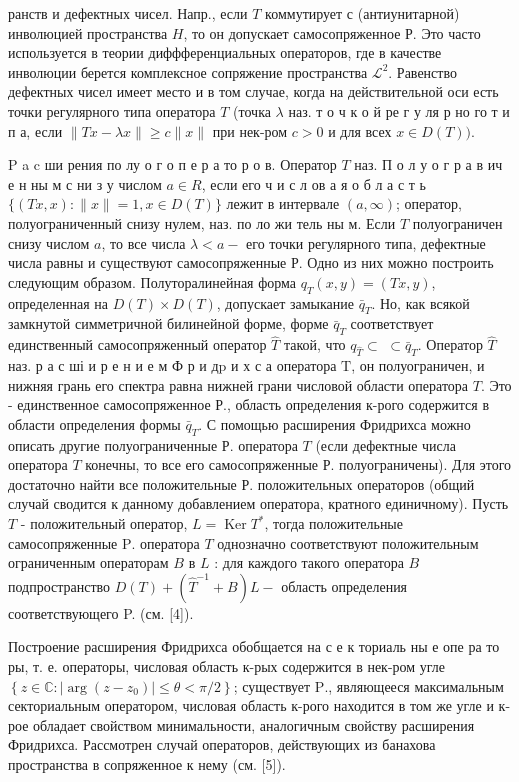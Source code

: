 \documentclass[10pt]{article}
\begin{document}
ранств и дефектных чисел. Напр., если $T$ коммутирует с (антиунитарной) инволюцией пространства $H$, то он допускает самосопряженное Р. Это часто используется в теории диффференциальных операторов, где в качестве инволюции берется комплексное сопряжение пространства $\mathscr{L}^{2}$. Равенство дефектных чисел имеет место и в том случае, когда на действительной оси есть точки регулярного типа оператора $T$ (точка $\lambda$ наз. т о ч к о й ре г у ля р но го т и п а, если $\|T x-\lambda x\| \geqslant c\|x\|$ при нек-ром $c>0$ и для всех $x \in D(T))$.



$\mathrm{P}$ a c ши рения по лу о г о п е р а то р о в. Оператор $T$ наз. П о л у о г р а в ич е н ны м с ни з у числом $a \in R$, если его ч и с л ов а я о б л а с т ь $\{(T x, x):\|x\|=1, x \in D(T)\}$ лежит в интервале $(a, \infty)$; оператор, полуограниченный снизу нулем, наз. по ло жи тель ны м. Если $T$ полуограничен снизу числом $a$, то все числа $\lambda<a-$ его точки регулярного типа, дефектные числа равны и существуют самосопряженные Р. Одно из них можно построить следующим образом. Полуторалинейная форма $q_{T}(x, y)=(T x, y)$, определенная на $D(T) \times D(T)$, допускает замыкание $\bar{q}_{T}$. Но, как всякой замкнутой симметричной билинейной форме, форме $\bar{q}_{T}$ соответствует единственный самосопряженный оператор $\widehat{T}$ такой, что $q_{\widehat{T}} \subset$ $\subset \bar{q}_{T}$. Оператор $\hat{T}$ наз. р а с ші и р е н и е м Ф р и д$\mathrm{p}$ и х с а оператора $\mathrm{T}$, он полуограничен, и нижняя грань его спектра равна нижней грани числовой области оператора $T$. Это - единственное самосопряженное Р., область определения к-рого содержится в области определения формы $\bar{q}_{T}$. С помощью расширения Фридрихса можно описать другие полуограниченные Р. оператора $T$ (если дефектные числа оператора $T$ конечны, то все его самосопряженные Р. полуограничены). Для этого достаточно найти все положительные Р. положительных операторов (общий случай сводится к данному добавлением оператора, кратного единичному). Пусть $T$ - положительный оператор, $L=\operatorname{Ker} T^{*}$, тогда положительные самосопряженные $\mathrm{P}$. оператора $T$ однозначно соответствуют положительным ограниченным операторам $B$ в $L$ : для каждого такого оператора $B$ подпространство $D(T)+\left(\hat{T}^{-1}+B\right) L-$ область определения соответствующего P. (см. [4]).



Построение расширения Фридрихса обобщается на с е к ториаль ны е опе ра то ры, т. е. операторы, числовая область к-рых содержится в нек-ром угле $\left\{z \in \mathbb{C}:\left|\arg \left(z-z_{0}\right)\right| \leqslant \theta<\pi / 2\right\}$; существует $\mathrm{P}$., являющееся максимальным секториальным оператором, числовая область к-рого находится в том же угле и к-рое обладает свойством минимальности, аналогичным свойству расширения Фридрихса. Рассмотрен случай операторов, действующих из банахова пространства в сопряженное к нему (см. [5]).
\end{document}
